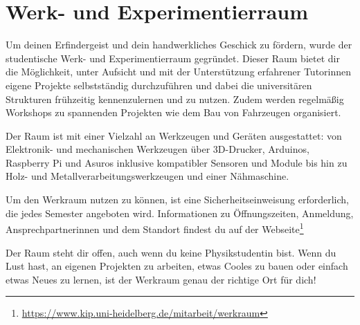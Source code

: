 
\section{Werk- und Experimentierraum}
\label{werk-und-experimentierraum}

Um deinen Erfindergeist und dein handwerkliches Geschick zu fördern, wurde der studentische Werk- und Experimentierraum gegründet. Dieser Raum bietet dir die Möglichkeit, unter Aufsicht und mit der Unterstützung erfahrener Tutorinnen eigene Projekte selbstständig durchzuführen und dabei die universitären Strukturen frühzeitig kennenzulernen und zu nutzen. Zudem werden regelmäßig Workshops zu spannenden Projekten wie dem Bau von Fahrzeugen organisiert.

Der Raum ist mit einer Vielzahl an Werkzeugen und Geräten ausgestattet: von Elektronik- und mechanischen Werkzeugen über 3D-Drucker, Arduinos, Raspberry Pi und Asuros inklusive kompatibler Sensoren und Module bis hin zu Holz- und Metallverarbeitungswerkzeugen und einer Nähmaschine.

Um den Werkraum nutzen zu können, ist eine Sicherheitseinweisung erforderlich, die jedes Semester angeboten wird. Informationen zu Öffnungszeiten, Anmeldung, Ansprechpartnerinnen und dem Standort findest du auf der Webseite\footnote{\url{https://www.kip.uni-heidelberg.de/mitarbeit/werkraum}}%

Der Raum steht dir offen, auch wenn du keine Physikstudentin bist. Wenn du Lust hast, an eigenen Projekten zu arbeiten, etwas Cooles zu bauen oder einfach etwas Neues zu lernen, ist der Werkraum genau der richtige Ort für dich!
